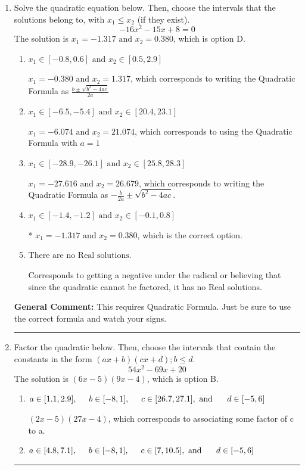 \documentclass{extbook}[14pt]
\newcommand{\litem}[1]{\item #1

\rule{\textwidth}{0.4pt}}
\begin{document}
\begin{enumerate}\litem{
Solve the quadratic equation below. Then, choose the intervals that the solutions belong to, with $x_1 \leq x_2$ (if they exist).
\[ -16x^{2} -15 x + 8 = 0 \]The solution is \( x_1 = -1.317 \text{ and } x_2 = 0.380 \), which is option D.\begin{enumerate}[label=\Alph*.]
\item \( x_1 \in [-0.8, 0.6] \text{ and } x_2 \in [0.5, 2.9] \)

 $x_1 = -0.380 \text{ and } x_2 = 1.317$, which corresponds to writing the Quadratic Formula as $\frac{b \pm \sqrt{b^2 - 4ac}}{2a}$
\item \( x_1 \in [-6.5, -5.4] \text{ and } x_2 \in [20.4, 23.1] \)

 $x_1 = -6.074 \text{ and } x_2 = 21.074$, which corresponds to using the Quadratic Formula with $a=1$
\item \( x_1 \in [-28.9, -26.1] \text{ and } x_2 \in [25.8, 28.3] \)

 $x_1 = -27.616 \text{ and } x_2 = 26.679$, which corresponds to writing the Quadratic Formula as $-\frac{b}{2a} \pm \sqrt{b^2 - 4ac}$.
\item \( x_1 \in [-1.4, -1.2] \text{ and } x_2 \in [-0.1, 0.8] \)

* $x_1 = -1.317 \text{ and } x_2 = 0.380$, which is the correct option.
\item \( \text{There are no Real solutions.} \)

Corresponds to getting a negative under the radical or believing that since the quadratic cannot be factored, it has no Real solutions.
\end{enumerate}

\textbf{General Comment:} This requires Quadratic Formula. Just be sure to use the correct formula and watch your signs.
}
\litem{
Factor the quadratic below. Then, choose the intervals that contain the constants in the form $(ax+b)(cx+d); b \leq d.$
\[ 54x^{2} -69 x + 20 \]The solution is \( (6x -5)(9x -4) \), which is option B.\begin{enumerate}[label=\Alph*.]
\item \( a \in [1.1, 2.9], \hspace*{5mm} b \in [-8, 1], \hspace*{5mm} c \in [26.7, 27.1], \text{ and } \hspace*{5mm} d \in [-5, 6] \)

 $(2x -5)(27x -4)$, which corresponds to associating some factor of c to a.
\item \( a \in [4.8, 7.1], \hspace*{5mm} b \in [-8, 1], \hspace*{5mm} c \in [7, 10.5], \text{ and } \hspace*{5mm} d \in [-5, 6] \)


\end{enumerate}}
\end{enumerate}
\end{document}

